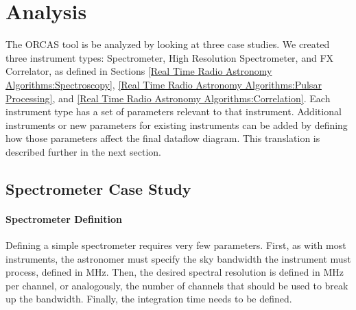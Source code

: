 \chapter{Analysis} \label{Analysis}

The ORCAS tool is be analyzed by looking at three case studies. 
We created three instrument types: Spectrometer, High Resolution Spectrometer, and FX Correlator, as defined in Sections \ref{Real Time Radio Astronomy Algorithms:Spectroscopy}, \ref{Real Time Radio Astronomy Algorithms:Pulsar Processing}, and \ref{Real Time Radio Astronomy Algorithms:Correlation}. 
Each instrument type has a set of parameters relevant to that instrument. 
Additional instruments or new parameters for existing instruments can be added by defining how those parameters affect the final dataflow diagram. 
This translation is described further in the next section.









\section{Spectrometer Case Study}

\subsubsection{Spectrometer Definition}
Defining a simple spectrometer requires very few parameters. 
First, as with most instruments, the astronomer must specify the sky bandwidth the instrument must process, defined in MHz.
Then, the desired spectral resolution is defined in MHz per channel, or analogously, the number of channels that should be used to break up the bandwidth.
Finally, the integration time needs to be defined.


